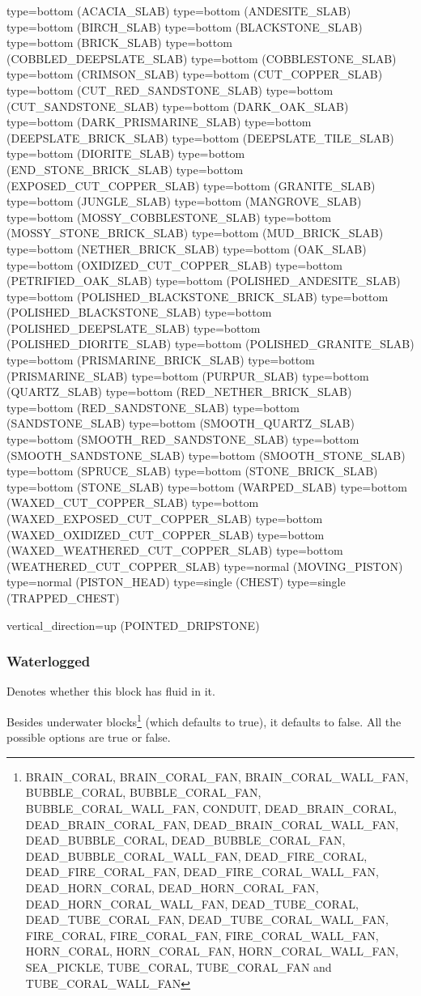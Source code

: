 type=bottom (ACACIA_SLAB)
type=bottom (ANDESITE_SLAB)
type=bottom (BIRCH_SLAB)
type=bottom (BLACKSTONE_SLAB)
type=bottom (BRICK_SLAB)
type=bottom (COBBLED_DEEPSLATE_SLAB)
type=bottom (COBBLESTONE_SLAB)
type=bottom (CRIMSON_SLAB)
type=bottom (CUT_COPPER_SLAB)
type=bottom (CUT_RED_SANDSTONE_SLAB)
type=bottom (CUT_SANDSTONE_SLAB)
type=bottom (DARK_OAK_SLAB)
type=bottom (DARK_PRISMARINE_SLAB)
type=bottom (DEEPSLATE_BRICK_SLAB)
type=bottom (DEEPSLATE_TILE_SLAB)
type=bottom (DIORITE_SLAB)
type=bottom (END_STONE_BRICK_SLAB)
type=bottom (EXPOSED_CUT_COPPER_SLAB)
type=bottom (GRANITE_SLAB)
type=bottom (JUNGLE_SLAB)
type=bottom (MANGROVE_SLAB)
type=bottom (MOSSY_COBBLESTONE_SLAB)
type=bottom (MOSSY_STONE_BRICK_SLAB)
type=bottom (MUD_BRICK_SLAB)
type=bottom (NETHER_BRICK_SLAB)
type=bottom (OAK_SLAB)
type=bottom (OXIDIZED_CUT_COPPER_SLAB)
type=bottom (PETRIFIED_OAK_SLAB)
type=bottom (POLISHED_ANDESITE_SLAB)
type=bottom (POLISHED_BLACKSTONE_BRICK_SLAB)
type=bottom (POLISHED_BLACKSTONE_SLAB)
type=bottom (POLISHED_DEEPSLATE_SLAB)
type=bottom (POLISHED_DIORITE_SLAB)
type=bottom (POLISHED_GRANITE_SLAB)
type=bottom (PRISMARINE_BRICK_SLAB)
type=bottom (PRISMARINE_SLAB)
type=bottom (PURPUR_SLAB)
type=bottom (QUARTZ_SLAB)
type=bottom (RED_NETHER_BRICK_SLAB)
type=bottom (RED_SANDSTONE_SLAB)
type=bottom (SANDSTONE_SLAB)
type=bottom (SMOOTH_QUARTZ_SLAB)
type=bottom (SMOOTH_RED_SANDSTONE_SLAB)
type=bottom (SMOOTH_SANDSTONE_SLAB)
type=bottom (SMOOTH_STONE_SLAB)
type=bottom (SPRUCE_SLAB)
type=bottom (STONE_BRICK_SLAB)
type=bottom (STONE_SLAB)
type=bottom (WARPED_SLAB)
type=bottom (WAXED_CUT_COPPER_SLAB)
type=bottom (WAXED_EXPOSED_CUT_COPPER_SLAB)
type=bottom (WAXED_OXIDIZED_CUT_COPPER_SLAB)
type=bottom (WAXED_WEATHERED_CUT_COPPER_SLAB)
type=bottom (WEATHERED_CUT_COPPER_SLAB)
type=normal (MOVING_PISTON)
type=normal (PISTON_HEAD)
type=single (CHEST)
type=single (TRAPPED_CHEST)

vertical_direction=up (POINTED_DRIPSTONE)

\subsubsection{Waterlogged}
Denotes whether this block has fluid in it.

Besides underwater blocks\footnote{BRAIN\_CORAL, BRAIN\_CORAL\_FAN, BRAIN\_CORAL\_WALL\_FAN, BUBBLE\_CORAL, BUBBLE\_CORAL\_FAN, BUBBLE\_CORAL\_WALL\_FAN, CONDUIT, DEAD\_BRAIN\_CORAL, DEAD\_BRAIN\_CORAL\_FAN, DEAD\_BRAIN\_CORAL\_WALL\_FAN, DEAD\_BUBBLE\_CORAL, DEAD\_BUBBLE\_CORAL\_FAN, DEAD\_BUBBLE\_CORAL\_WALL\_FAN, DEAD\_FIRE\_CORAL, DEAD\_FIRE\_CORAL\_FAN, DEAD\_FIRE\_CORAL\_WALL\_FAN, DEAD\_HORN\_CORAL, DEAD\_HORN\_CORAL\_FAN, DEAD\_HORN\_CORAL\_WALL\_FAN, DEAD\_TUBE\_CORAL, DEAD\_TUBE\_CORAL\_FAN, DEAD\_TUBE\_CORAL\_WALL\_FAN, FIRE\_CORAL, FIRE\_CORAL\_FAN, FIRE\_CORAL\_WALL\_FAN, HORN\_CORAL, HORN\_CORAL\_FAN, HORN\_CORAL\_WALL\_FAN, SEA\_PICKLE, TUBE\_CORAL, TUBE\_CORAL\_FAN and TUBE\_CORAL\_WALL\_FAN} (which defaults to true), it defaults to false. All the possible options are true or false.


